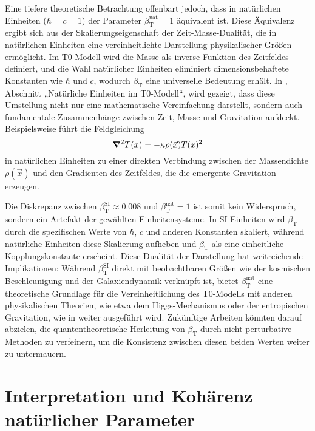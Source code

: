 \documentclass[12pt,a4paper]{article}
\newcommand{\Tfield}{T(x)}
\newcommand{\betaT}{\beta_{\text{T}}}
\newcommand{\vecx}{\vec{x}}
\begin{document}
	Eine tiefere theoretische Betrachtung offenbart jedoch, dass in natürlichen Einheiten (\(\hbar = c = 1\)) der Parameter \(\betaT^{\text{nat}} = 1\) äquivalent ist. Diese Äquivalenz ergibt sich aus der Skalierungseigenschaft der Zeit-Masse-Dualität, die in natürlichen Einheiten eine vereinheitlichte Darstellung physikalischer Größen ermöglicht. Im T0-Modell wird die Masse als inverse Funktion des Zeitfeldes definiert, und die Wahl natürlicher Einheiten eliminiert dimensionsbehaftete Konstanten wie \(\hbar\) und \(c\), wodurch \(\betaT\) eine universelle Bedeutung erhält. In \cite{pascher_emergente_gravitation_2025}, Abschnitt „Natürliche Einheiten im T0-Modell“, wird gezeigt, dass diese Umstellung nicht nur eine mathematische Vereinfachung darstellt, sondern auch fundamentale Zusammenhänge zwischen Zeit, Masse und Gravitation aufdeckt. Beispielsweise führt die Feldgleichung 
	\begin{equation}
		\grad^2 \Tfield = -\kappa \rho(\vecx) \Tfield^2
	\end{equation}
	in natürlichen Einheiten zu einer direkten Verbindung zwischen der Massendichte \(\rho(\vecx)\) und den Gradienten des Zeitfeldes, die die emergente Gravitation erzeugen.
	
	Die Diskrepanz zwischen \(\betaT^{\text{SI}} \approx 0.008\) und \(\betaT^{\text{nat}} = 1\) ist somit kein Widerspruch, sondern ein Artefakt der gewählten Einheitensysteme. In SI-Einheiten wird \(\betaT\) durch die spezifischen Werte von \(\hbar\), \(c\) und anderen Konstanten skaliert, während natürliche Einheiten diese Skalierung aufheben und \(\betaT\) als eine einheitliche Kopplungskonstante erscheint. Diese Dualität der Darstellung hat weitreichende Implikationen: Während \(\betaT^{\text{SI}}\) direkt mit beobachtbaren Größen wie der kosmischen Beschleunigung und der Galaxiendynamik verknüpft ist, bietet \(\betaT^{\text{nat}}\) eine theoretische Grundlage für die Vereinheitlichung des T0-Modells mit anderen physikalischen Theorien, wie etwa dem Higgs-Mechanismus oder der entropischen Gravitation, wie in \cite{pascher_emergente_gravitation_2025} weiter ausgeführt wird. Zukünftige Arbeiten könnten darauf abzielen, die quantentheoretische Herleitung von \(\betaT\) durch nicht-perturbative Methoden zu verfeinern, um die Konsistenz zwischen diesen beiden Werten weiter zu untermauern.
	
	\section{Interpretation und Kohärenz natürlicher Parameter}
	
\end{document}
